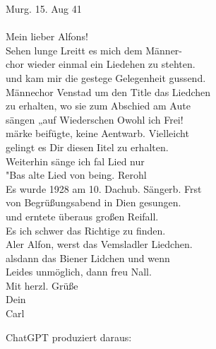 \documentclass[12pt, a4paper, ngerman, bidi=default]{article}
\begin{document}
  \begin{tcolorbox}[colback=oldLetter, colframe=black, sharp corners, width=\textwidth]
    Murg. 15. Aug 41 \\
    \\
    Mein lieber Alfons! \\
    Sehen lunge Lreitt es mich dem Männer- \\
    chor wieder einmal ein Liedehen zu stehten. \\
    und kam mir die gestege Gelegenheit gussend. \\
    Männechor Venstad um den Title das Liedchen \\
    zu erhalten, wo sie zum Abschied am Aute \\
    sängen „auf Wiederschen Owohl ich Frei! \\
    märke beifügte, keine Aentwarb. Vielleicht \\
    gelingt es Dir diesen Iitel zu erhalten. \\
    Weiterhin sänge ich fal Lied nur \\
    "Bas alte Lied von being. Rerohl \\
    Es wurde 1928 am 10. Dachub. Sängerb. Frst \\
    von Begrüßungsabend in Dien gesungen. \\
    und erntete überaus großen Reifall. \\
    Es ich schwer das Richtige zu finden. \\
    Aler Alfon, werst das Vemsladler Liedchen. \\
    alsdann das Biener Lidchen und wenn \\
    Leides unmöglich, dann freu Nall. \\
    Mit herzl. Grüße \\
    Dein \\
    Carl \\
  \end{tcolorbox}
    ChatGPT produziert daraus:
\end{document}
